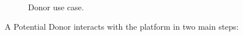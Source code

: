 \begin{figure}[h]
	\begin{center}
	\end{center}
	\caption{Donor use case.}\label{fig:donor_use_case}
\end{figure}

A Potential Donor interacts with the platform in two main steps:

